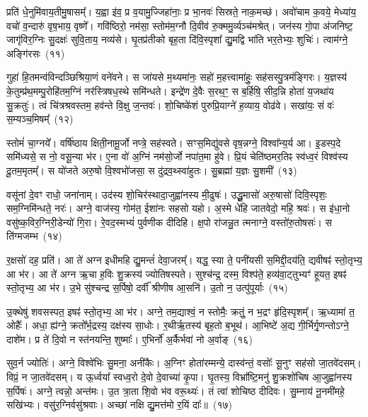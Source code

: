 प्रति॑ धे॒नुमि॑वाय॒तीमु॒षासम्᳚। य॒ह्वा इ॑व॒ प्र व॒यामु॒ज्जिहा॑नाः॒ प्र भा॒नवः॑ सिस्रते॒ नाक॒मच्छ॑। अवो॑चाम क॒वये॒ मेध्या॑य॒ वचो॑ व॒न्दारु॑ वृष॒भाय॒ वृष्णे᳚। गवि॑ष्ठिरो॒ नम॑सा॒ स्तोम॑म॒ग्नौ दि॒वीव॑ रु॒क्ममु॒र्व्यञ्च॑मश्रेत्। जन॑स्य गो॒पा अ॑जनिष्ट॒ जागृ॑विर॒ग्निः सु॒दक्षः॑ सुवि॒ताय॒ नव्य॑से। घृ॒तप्र॑तीको बृह॒ता दि॑वि॒स्पृशा᳚ द्यु॒मद्वि भा॑ति भर॒तेभ्यः॒ शुचिः॑। त्वाम॑ग्ने॒ अङ्गि॑रसः~(११)

गुहा॑ हि॒तमन्व॑विन्दञ्छिश्रिया॒णं वने॑वने। स जा॑यसे म॒थ्यमा॑नः॒ सहो॑ म॒हत्त्वामा॑हुः॒ सह॑सस्पु॒त्रम॑ङ्गिरः। य॒ज्ञस्य॑ के॒तुम्प्र॑थ॒मम्पु॒रोहि॑तम॒ग्निं नर॑स्त्रिषध॒स्थे समि॑न्धते। इन्द्रे॑ण दे॒वैः स॒रथ॒ꣳ॒ स ब॒र्\mbox{}हिषि॒ सीद॒न्नि होता॑ य॒जथा॑य सु॒क्रतुः॑। त्वं चि॑त्रश्रवस्तम॒ हव॑न्ते वि॒क्षु ज॒न्तवः॑। शो॒चिष्के॑शं पुरुप्रि॒याग्ने॑ ह॒व्याय॒ वोढ॑वे। सखा॑यः॒ सं वः॑ स॒म्यञ्च॒मिषम्᳚~(१२)

स्तोमं॑ चा॒ग्नये᳚। वर्\mbox{}षि॑ष्ठाय क्षिती॒नामू॒र्जो नप्त्रे॒ सह॑स्वते। सꣳस॒मिद्यु॑वसे वृष॒न्नग्ने॒ विश्वा᳚न्य॒र्य आ। इ॒डस्प॒दे समि॑ध्यसे॒ स नो॒ वसू॒न्या भ॑र। ए॒ना वो॑ अ॒ग्निं नम॑सो॒र्जो नपा॑त॒मा हु॑वे। प्रि॒यं चेति॑ष्ठमर॒तिꣴ स्व॑ध्व॒रं विश्व॑स्य दू॒तम॒मृतम्᳚। स यो॑जते अरु॒षो वि॒श्वभो॑जसा॒ स दु॑द्रव॒थ्स्वा॑हुतः। सु॒ब्रह्मा॑ य॒ज्ञः सु॒शमी᳚~(१३)

वसू॑नां दे॒वꣳ राधो॒ जना॑नाम्। उद॑स्य शो॒चिर॑स्थादा॒जुह्वा॑नस्य मी॒ढुषः॑। उद्धू॒मासो॑ अरु॒षासो॑ दिवि॒स्पृशः॒ सम॒ग्निमि॑न्धते॒ नरः॑। अग्ने॒ वाज॑स्य॒ गोम॑त॒ ईशा॑नः सहसो यहो। अ॒स्मे धे॑हि जातवेदो॒ महि॒ श्रवः॑। स इ॑धा॒नो वसु॑ष्क॒विर॒ग्निरी॒डेन्यो॑ गि॒रा। रे॒वद॒स्मभ्यं॑ पुर्वणीक दीदिहि। क्ष॒पो रा॑जन्नु॒त त्मनाग्ने॒ वस्तो॑रु॒तोषसः॑। स ति॑ग्मजम्भ~(१४)

र॒क्षसो॑ दह॒ प्रति॑। आ ते॑ अग्न इधीमहि द्यु॒मन्तं॑ देवा॒जरम्᳚। यद्ध॒ स्या ते॒ पनी॑यसी स॒मिद्दी॒दय॑ति॒ द्यवीषꣴ॑ स्तो॒तृभ्य॒ आ भ॑र। आ ते॑ अग्न ऋ॒चा ह॒विः शु॒क्रस्य॑ ज्योतिषस्पते। सुश्च॑न्द्र॒ दस्म॒ विश्प॑ते॒ हव्य॑वा॒ट्तुभ्यꣳ॑ हूयत॒ इषꣴ॑ स्तो॒तृभ्य॒ आ भ॑र। उ॒भे सु॑श्चन्द्र स॒र्पिषो॒ दर्वी᳚ श्रीणीष आ॒सनि॑। उ॒तो न॒ उत्पु॑पूर्याः~(१५)

उ॒क्थेषु॑ शवसस्पत॒ इषꣴ॑ स्तो॒तृभ्य॒ आ भ॑र। अग्ने॒ तम॒द्याश्वं॒ न स्तोमैः॒ क्रतुं॒ न भ॒द्रꣳ हृ॑दि॒स्पृशम्᳚। ऋ॒ध्यामा॑ त॒ ओहैः᳚। अधा॒ ह्य॑ग्ने॒ क्रतो᳚र्भ॒द्रस्य॒ दक्ष॑स्य सा॒धोः। र॒थीर्\mbox{}ऋ॒तस्य॑ बृह॒तो ब॒भूथ॑। आ॒भिष्टे॑ अ॒द्य गी॒र्भिर्गृ॒णन्तो\-ऽग्ने॒ दाशे॑म। प्र ते॑ दि॒वो न स्त॑नयन्ति॒ शुष्माः᳚। ए॒भिर्नो॑ अ॒र्कैर्भवा॑ नो अ॒र्वाङ्~(१६)

सुव॒र्न ज्योतिः॑। अग्ने॒ विश्वे॑भिः सु॒मना॒ अनी॑कैः। अ॒ग्निꣳ होता॑रम्मन्ये॒ दास्व॑न्तं॒ वसोः᳚ सू॒नुꣳ सह॑सो जा॒तवे॑दसम्। विप्रं॒ न जा॒तवे॑दसम्। य ऊ॒र्ध्वया᳚ स्वध्व॒रो दे॒वो दे॒वाच्या॑ कृ॒पा। घृ॒तस्य॒ विभ्रा᳚ष्टि॒मनु॑ शु॒क्रशो॑चिष आ॒जुह्वा॑नस्य स॒र्पिषः॑। अग्ने॒ त्वन्नो॒ अन्त॑मः। उ॒त त्रा॒ता शि॒वो भ॑व वरू॒थ्यः॑। तं त्वा॑ शोचिष्ठ दीदिवः। सु॒म्नाय॑ नू॒नमी॑महे॒ सखि॑भ्यः। वसु॑र॒ग्निर्वसु॑श्रवाः। अच्छा॑ नक्षि द्यु॒मत्त॑मो र॒यिं दाः᳚॥~(१७)

